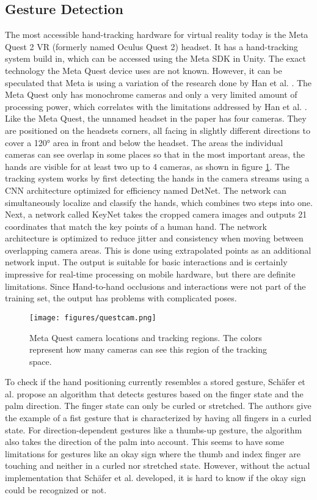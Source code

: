 \subsection{Gesture Detection}\label{gesture-detection}

The most accessible hand-tracking hardware for virtual reality today is
the Meta Quest 2 VR (formerly named Oculus Quest 2) headset. It has a hand-tracking system build in, which can
be accessed using the Meta SDK in Unity. The exact technology the
Meta Quest device uses are not known. However, it can be speculated that
Meta is using a variation of the research done by Han et al. \cite{Han}. The
Meta Quest only has monochrome cameras and only a very limited amount
of processing power, which correlates with the limitations addressed by
Han et al. \cite{Han}. Like the Meta Quest, the
unnamed headset in the paper has four cameras. They are positioned on the
headsets corners, all facing in slightly different directions to cover a
120° area in front and below the headset. The areas the individual
cameras can see overlap in some places so that in the most important
areas, the hands are visible for at least two up to 4 cameras, as shown in figure \ref{fig:questcam}. The
tracking system works by first detecting the hands in the camera streams
using a CNN architecture optimized for efficiency named DetNet. The
network can simultaneously localize and classify the hands, which
combines two steps into one. Next, a network called KeyNet takes the 
cropped camera images and outputs 21 coordinates that match the key points
of a human hand. The network architecture is optimized to reduce jitter
and consistency when moving between overlapping camera areas. This is
done using extrapolated points as an additional network input. The
output is suitable for basic interactions and is certainly impressive for
real-time processing on mobile hardware, but there are definite
limitations. Since Hand-to-hand occlusions and interactions were not
part of the training set, the output has problems with complicated
poses.

\begin{figure}[hbt!]
  \centering
  \texttt{[image: figures/questcam.png]}
  \caption{Meta Quest camera locations and tracking regions. The colors represent how many cameras can see this region of the tracking space.}
  \label{fig:questcam}
\end{figure}


To check if the hand positioning currently resembles a stored gesture, Schäfer et al. \cite{Schafer2021} propose an algorithm that detects gestures based on the finger state and the palm direction. The finger state can only be curled or stretched. The authors give the example of a fist gesture that is characterized by having all fingers in a curled state. For direction-dependent gestures like a thumbs-up gesture, the algorithm also takes the direction of the palm into account. This seems to have some limitations for gestures like an okay sign where the thumb and index finger are touching and neither in a curled nor stretched state. However, without the actual implementation that Schäfer et al. developed, it is hard to know if the okay sign could be recognized or not.

